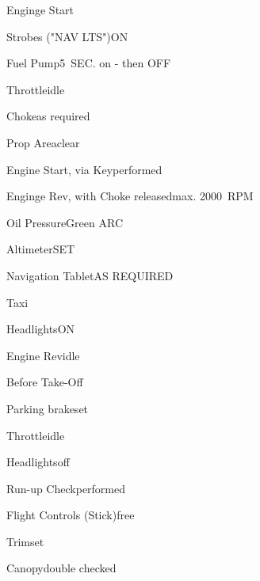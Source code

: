 \begin{checklist}{Enginge Start}
	\item{Strobes ("NAV LTS")}{ON}
	\item{Fuel Pump}{5~SEC. on - then OFF}
	\item{Throttle}{idle}
	\item{Choke}{as required}
	\item{Prop Area}{clear}
	\item{Engine Start, via Key}{performed}
	\item{Enginge Rev, with Choke released}{max. 2000~RPM}
	\item{Oil Pressure}{Green ARC}
	\item{Altimeter}{SET}
	\item{Navigation Tablet}{AS REQUIRED}
\end{checklist}

\begin{checklist}{Taxi}
	\item{Headlights}{ON}
	\item{Engine Rev}{idle}
\end{checklist}

\begin{checklist}{Before Take-Off}
	\item{Parking brake}{set}
	\item{Throttle}{idle}
	\item{Headlights}{off}
	\item{Run-up Check}{performed}
	\item{Flight Controls (Stick)}{free}
	\item{Trim}{set}
	\item{Canopy}{double checked}
\end{checklist}


